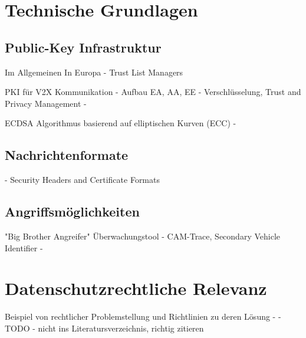
\section{Technische Grundlagen}
\label{ch:FirstContentSection}




\subsection{Public-Key Infrastruktur}
\label{sec:FirstContentSection:FirstSubSection}
Im Allgemeinen
In Europa - Trust List Managers

PKI für V2X Kommunikation - Aufbau EA, AA, EE - \cite{Strubbe2017}
Verschlüsselung, Trust and Privacy Management - \cite{ETSI2018}

ECDSA Algorithmus basierend auf elliptischen Kurven (ECC) - \cite{Barker2013}

\subsection{Nachrichtenformate}
\label{sec:FirstContentSection:SecondSubSection}

\cite{ETSI2013} - Security Headers and Certificate Formats

\subsection{Angriffsmöglichkeiten}
\label{sec:FirstContentSection:ThirdSubSection}

"Big Brother Angreifer" \cite{Wiedersheim2010}
Überwachungstool - CAM-Trace, 
Secondary Vehicle Identifier - \cite{Ullmann2016}

\section{Datenschutzrechtliche Relevanz}
\label{ch:SecondContentSection}

Beispiel von rechtlicher Problemstellung und Richtlinien zu deren Lösung - \cite{EUCooperativeV2X} - TODO - nicht ins Literatursverzeichnis, richtig zitieren


